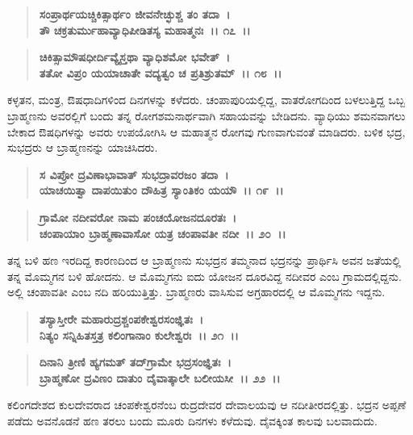 \begin{verse}
\textbf{ಸಂಪ್ರಾರ್ಥಯಚ್ಚಿಕಿತ್ಸಾರ್ಥಂ ಜೀವನೇಚ್ಛುಶ್ಚ ತಂ ತದಾ~।}\\\textbf{ತೌ ಚಕ್ರತುರ್ಮುಹಾವ್ಯಾಧಿಪೀಡಿತಸ್ಯ ಮಹಾತ್ಮನಃ~।। ೧೭~।।}
\end{verse}

\begin{verse}
\textbf{ಚಿಕಿತ್ಸಾಮೌಷಧೀರ್ದಿವ್ಯೈಸ್ತಥಾ ವ್ಯಾಧಿಶಮೋ ಭವೇತ್~।}\\\textbf{ತತೋ ವಿಪ್ರಂ ಯಯಾಚಾತೇ ವದ್ಯತ್ವಂ ಚ ಪ್ರತಿಶ್ರುತಮ್~।। ೧೮~।।}
\end{verse}

ಕಳ್ಳತನ, ಮಂತ್ರ, ಔಷಧಾದಿಗಳಿಂದ ದಿನಗಳನ್ನು ಕಳೆದರು. ಚಂಪಾಪುರಿಯಲ್ಲಿದ್ದ, ವಾತರೋಗದಿಂದ ಬಳಲುತ್ತಿದ್ದ ಒಬ್ಬ ಬ್ರಾಹ್ಮಣನು ಅವರಲ್ಲಿಗೆ ಬಂದು ತನ್ನ ರೋಗಶಮನಾರ್ಥವಾಗಿ ಸಹಾಯವನ್ನು ಬೇಡಿದನು. ವ್ಯಾಧಿಯು ಶಮನವಾಗಲು ಬೇಕಾದ ಔಷಧಿಗಳನ್ನು ಅವರು ಉಪಯೋಗಿಸಿ ಆ ಮಹಾತ್ಮನ ರೋಗವು ಗುಣವಾಗುವಂತೆ ಮಾಡಿದರು. ಬಳಿಕ ಭದ್ರ, ಸುಭದ್ರರು ಆ ಬ್ರಾಹ್ಮಣನನ್ನು ಯಾಚಿಸಿದರು.

\begin{verse}
\textbf{ಸ ವಿಪ್ರೋ ದ್ರವಿಣಾಭಾವಾತ್ ಸುಭದ್ರಾವರಜಂ ತದಾ~।}\\\textbf{ಯಾಚಯಿತ್ವಾ ದಾಪಯಿತುಂ ದೌಹಿತ್ರ ಸ್ಯಾಂತಿಕಂ ಯಯೌ~।। ೧೯~।। }
\end{verse}

\begin{verse}
\textbf{ಗ್ರಾಮೋ ನದೀವರೋ ನಾಮ ಪಂಚಯೋಜನದೂರತಃ~।}\\\textbf{ಚಂಪಾಯಾಂ ಬ್ರಾಹ್ಮಣಾವಾಸೋ ಯತ್ರ ಚಂಪಾವತೀ ನದೀ~।। ೨೦~।।}
\end{verse}

ತನ್ನ ಬಳಿ ಹಣ ಇರದಿದ್ದ ಕಾರಣದಿಂದ ಆ ಬ್ರಾಹ್ಮಣನು ಸುಭದ್ರನ ತಮ್ಮನಾದ ಭದ್ರನನ್ನು ಪ್ರಾರ್ಥಿಸಿ ಅವನ ಜತೆಯಲ್ಲಿ ತನ್ನ ಮೊಮ್ಮಗನ ಬಳಿ ಹೋದನು. ಆ ಮೊಮ್ಮಗನು ಐದು ಯೋಜನ ದೂರವಿದ್ದ ನದೀವರ ಎಂಬ ಗ್ರಾಮದಲ್ಲಿದ್ದನು. ಅಲ್ಲಿ ಚಂಪಾವತೀ ಎಂಬ ನದಿ ಹರಿಯುತ್ತಿತ್ತು. ಬ್ರಾಹ್ಮಣರು ವಾಸಿಸುವ ಅಗ್ರಹಾರದಲ್ಲಿ ಆ ಮೊಮ್ಮಗನು ಇದ್ದನು.

\begin{verse}
\textbf{ತಸ್ಯಾಸ್ತೀರೇ ಮಹಾರುದ್ರಶ್ಚಂಪಕೇಶ್ವರಸಂಜ್ಞಿತಃ~।}\\\textbf{ನಿತ್ಯಂ ಸನ್ನಿಹಿತಸ್ತತ್ರ ಕಲಿಂಗಾನಾಂ ಕುಲೇಶ್ವರಃ~।। ೨೧~।। }
\end{verse}

\begin{verse}
\textbf{ದಿನಾನಿ ತ್ರೀಣಿ ಹ್ಯಗಮತ್ ತದ್‌ಗ್ರಾಮೇ ಭದ್ರಸಂಜ್ಞಿತಃ~।}\\\textbf{ಬ್ರಾಹ್ಮಣೋ ದ್ರವಿಣಂ ದಾತುಂ ದೈವಾತ್ಕಾಲೇ ಬಲೀಯಸೀ~।। ೨೨~।।}
\end{verse}

ಕಲಿಂಗದೇಶದ ಕುಲದೇವರಾದ ಚಂಪಕೇಶ್ವರನೆಂಬ ರುದ್ರದೇವರ ದೇವಾಲಯವು ಆ ನದೀತೀರದಲ್ಲಿತ್ತು. ಭದ್ರನ ಅಪ್ಪಣೆ ಪಡೆದು ಅವನೊಡನೆ ಹಣ ತರಲು ಬಂದು ಮೂರು ದಿನಗಳು ಕಳೆದುವು. ದೈವಕ್ಕಿಂತ ಕಾಲವು ಬಲವಾದುದು.

